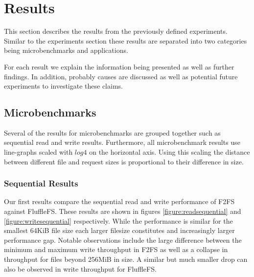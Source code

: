 \chapter{Results}

This section describes the results from the previously defined experiments.
Similar to the experiments section these results are separated into two
categories being microbenchmarks and applications.

For each result we explain the information being presented as well as further
findings. In addition, probably causes are discussed as well as
potential future experiments to investigate these claims.

\section{Microbenchmarks}

Several of the results for microbenchmarks are grouped together such as
sequential read and write results. Furthermore, all microbenchmark results use
line-graphs scaled with $log4$ on the horizontal axis. Using this scaling the
distance between different file and request sizes is proportional to their
difference in size.

\subsection{Sequential Results}

Our first results compare the sequential read and write performance of F2FS
against FluffleFS. These results are shown in figures
\ref{figure:readsequential} and \ref{figure:writesequential} respectively.
While the performance is similar for the smallest 64KiB file size each larger
filesize constitutes and increasingly larger performance gap. Notable
observations include the large difference between the minimum and
maximum write throughput in F2FS as well as a collapse in throughput for files
beyond 256MiB in size. A similar but much smaller drop can also be observed in
write throughput for FluffleFS.

